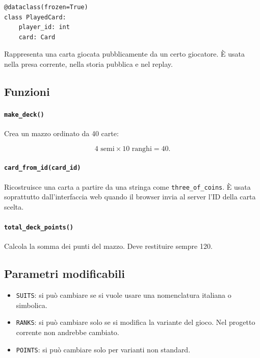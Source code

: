 \documentclass[11pt,a4paper]{article}
\begin{document}
\begin{verbatim}
@dataclass(frozen=True)
class PlayedCard:
    player_id: int
    card: Card
\end{verbatim}

Rappresenta una carta giocata pubblicamente da un certo giocatore. È usata nella
presa corrente, nella storia pubblica e nel replay.

\subsection{Funzioni}

\paragraph{\texttt{make\_deck()}}

Crea un mazzo ordinato da 40 carte:

\[
4 \text{ semi} \times 10 \text{ ranghi} = 40.
\]

\paragraph{\texttt{card\_from\_id(card\_id)}}

Ricostruisce una carta a partire da una stringa come
\texttt{three\_of\_coins}. È usata soprattutto dall'interfaccia web quando il
browser invia al server l'ID della carta scelta.

\paragraph{\texttt{total\_deck\_points()}}

Calcola la somma dei punti del mazzo. Deve restituire sempre 120.

\subsection{Parametri modificabili}

\begin{itemize}
  \item \texttt{SUITS}: si può cambiare se si vuole usare una nomenclatura
  italiana o simbolica.
  \item \texttt{RANKS}: si può cambiare solo se si modifica la variante del
  gioco. Nel progetto corrente non andrebbe cambiato.
  \item \texttt{POINTS}: si può cambiare solo per varianti non standard.
\end{itemize}
\end{document}
